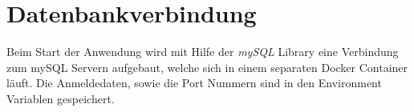 \section{Datenbankverbindung}

Beim Start der Anwendung wird mit Hilfe der \textit{mySQL} Library eine Verbindung zum mySQL
Servern aufgebaut, welche sich in einem separaten Docker Container läuft. Die Anmeldedaten,
sowie die Port Nummern sind in den Environment Variablen gespeichert.
